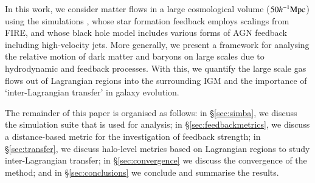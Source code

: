 In this work, we consider matter flows in a large cosmological volume ($50
h^{-1}{\rm Mpc}{}$) using the \simba{} simulations \citep{Dave2019}, whose star
formation feedback employs scalings from FIRE, and whose black hole model
includes various forms of AGN feedback including high-velocity jets. More
generally, we present a framework for analysing the relative motion of dark
matter and baryons on large scales due to hydrodynamic and feedback
processes. With this, we quantify the large scale gas flows out of Lagrangian
regions into the surrounding IGM and the importance of `inter-Lagrangian
transfer' in galaxy evolution.

The remainder of this paper is organised as follows: in \S\ref{sec:simba}, we
discuss the \simba{} simulation suite that is used for analysis; in
\S\ref{sec:feedbackmetrics}, we discuss a distance-based metric for the
investigation of feedback strength; in \S\ref{sec:transfer}, we discuss
halo-level metrics based on Lagrangian regions to study inter-Lagrangian
transfer; in \S\ref{sec:convergence} we discuss the convergence of the
method; and in \S\ref{sec:conclusions} we conclude and summarise the results.